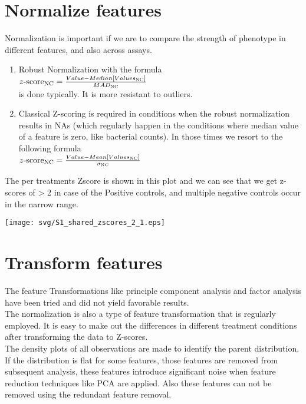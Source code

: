 \documentclass[12pt]{article}
\begin{document}
\section{Normalize features}
Normalization is important if we are to compare the strength of phenotype in different features, and also across assays.
	\begin{enumerate}
		\item Robust Normalization with the formula\\
		$z\hbox{-score}_{\rm NC} = \frac{Value - Median [Values_{\rm NC}]}{MAD_{\rm NC}}$ \\
		is done typically. It is more resistant to outliers.
		\item Classical Z-scoring is required in conditions when the robust normalization results in NAs (which regularly happen in the conditions where median value of a feature is zero, like bacterial counts). In those times we resort to the following formula\\
		$z\hbox{-score}_{\rm NC} = \frac{Value - Mean [Values_{\rm NC}]}{\sigma_{\rm NC}}$ \\
	\end{enumerate}
	The per treatments Zscore is shown in this plot and we can see that we get z-scores of  > 2 in case of the Positive controls, and multiple negative controls occur in the narrow range. 
	\begin{center} \texttt{[image: svg/S1\_shared\_zscores\_2\_1.eps]} \end{center}
	

\section{Transform features}
The feature Transformations like principle component analysis and factor analysis have been tried and did not yield favorable results. \\
The normalization is also a type of feature transformation that is regularly employed. It is easy to make out the differences in different treatment conditions after transforming the data to Z-scores. \\
The density plots of all observations are made to identify the parent distribution. If the distribution is flat for some features, those features are removed from subsequent analysis, these features introduce significant noise when feature reduction techniques like PCA are applied. Also these features can not be removed using the redundant feature removal.
\end{document}
